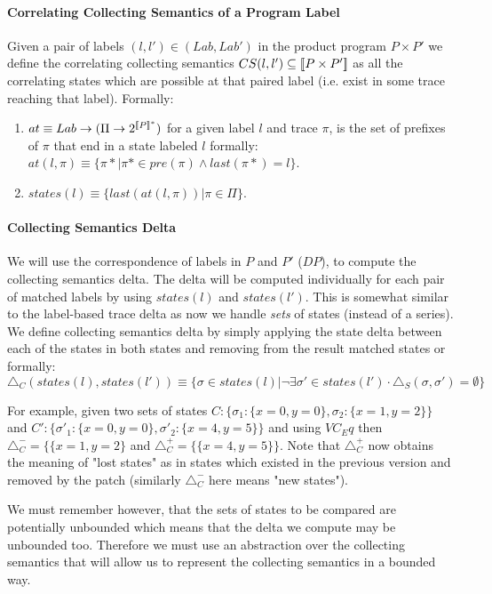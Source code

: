 \paragraph{Correlating Collecting Semantics of a Program Label} 
Given a pair of labels $(l,l') \in (Lab,Lab')$ in the product program $P \times P'$ we define the correlating collecting semantics $CS(l,l') \subseteq \lbrack\!\lbrack P \times P' \rbrack\!\rbrack$ as all the correlating states which are possible at that paired label (i.e. exist in some trace reaching that label). Formally:
\begin{enumerate}
\item $at \equiv Lab \rightarrow (\Pi \rightarrow 2^{\lbrack\!\lbrack P \rbrack\!\rbrack^*})$ for a given label $l$ and trace $\pi$, is the set of prefixes of $\pi$ that end in a state labeled $l$ formally: $at(l,\pi) \equiv \{\pi*|\pi* \in pre(\pi) \wedge last(\pi*)=l \}$.
\item $states(l) \equiv \{last(at(l,\pi)) | \pi \in \Pi\}$.
\end{enumerate}

\paragraph{Collecting Semantics Delta} 
 We will use the correspondence of labels in $P$ and $P'$ ($DP$), to compute the collecting semantics delta. The delta will be computed individually for each pair of matched labels by using $states(l)$ and $states(l')$. This is somewhat similar to the label-based trace delta as now we handle \emph{sets} of states (instead of a series). We define collecting semantics delta by simply applying the state delta  between each of the states in both states and removing from the result matched states or formally: $\triangle_{C}(states(l) ,states(l')) \equiv \{\sigma \in states(l)| \neg \exists \sigma' \in states(l') \cdot \triangle_{S}(\sigma, \sigma') = \emptyset\}$

For example, given two sets of states $C : \{\sigma_1:\{x=0,y=0\},\sigma_2:\{x=1,y=2\}\}$ and $C' : \{\sigma'_1:\{x=0,y=0\},\sigma'_2:\{x=4,y=5\}\}$ and using $VC_Eq$ then $\triangle_{C}^{-} = \{\{x=1,y=2\}$ and $\triangle_{C}^{+} = \{\{x=4,y=5\}\}$. Note that $\triangle_{C}^{+}$ now obtains the meaning of "lost states" as in states which existed in the previous version and removed by the patch (similarly $\triangle_{C}^{-}$ here means "new states").

We must remember however, that the sets of states to be compared are potentially unbounded which means that the delta we compute may be unbounded too. Therefore we must use an abstraction over the collecting semantics that will allow us to represent the collecting semantics in a bounded way.
